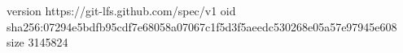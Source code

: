 version https://git-lfs.github.com/spec/v1
oid sha256:07294e5bdfb95cdf7e68058a07067c1f5d3f5aeedc530268e05a57e97945e608
size 3145824
